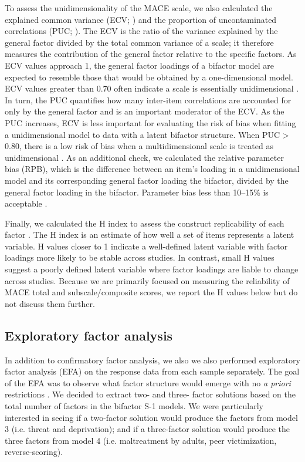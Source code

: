 \documentclass[letterpaper,man,natbib]{apa6}  %
\begin{document}
To assess the unidimensionality of the MACE scale, we also calculated the explained common variance (ECV; \citealt{sijtsma2009use}) and the proportion of uncontaminated correlations (PUC; \citealt{reise2013multidimensionality}). The ECV is the ratio of the variance explained by the general factor divided by the total common variance of a scale; it therefore measures the contribution of the general factor relative to the specific factors. As ECV values approach 1, the general factor loadings of a bifactor model are expected to resemble those that would be obtained by a one-dimensional model. ECV values greater than 0.70 often indicate a scale is essentially unidimensional \citep{rodriguez2016applying}. In turn, the PUC quantifies how many inter-item correlations are accounted for only by the general factor and is an important moderator of the ECV. As the PUC increases, ECV is less important for evaluating the risk of bias when fitting a unidimensional model to data with a latent bifactor structure. When PUC > 0.80, there is a low risk of bias when a multidimensional scale is treated as unidimensional \citep{reise2013multidimensionality}. As an additional check, we calculated the relative parameter bias (RPB), which is the difference between an item's loading in a unidimensional model and its corresponding general factor loading the bifactor, divided by the general factor loading in the bifactor. Parameter bias less than 10–15\% is acceptable \citep{muthen1987structural}.

Finally, we calculated the H index to assess the construct replicability of each factor \citep{hancock2001rethinking}. The H index is an estimate of how well a set of items represents a latent variable. H values closer to 1 indicate a well-defined latent variable with factor loadings more likely to be stable across studies. In contrast, small H values suggest a poorly defined latent variable where factor loadings are liable to change across studies. Because we are primarily focused on measuring the reliability of MACE total and subscale/composite scores, we report the H values below but do not discuss them further.

\subsection{Exploratory factor analysis}

In addition to confirmatory factor analysis, we also we also performed exploratory factor analysis (EFA) on the response data from each sample separately. The goal of the EFA was to observe what factor structure would emerge with no \emph{a priori} restrictions \citep{schmitt2018selecting}. We decided to extract two- and three- factor solutions based on the total number of factors in the bifactor S-1 models. We were particularly interested in seeing if a two-factor solution would produce the factors from model 3 (i.e. threat and deprivation); and if a three-factor solution would produce the three factors from model 4 (i.e. maltreatment by adults, peer victimization, reverse-scoring). 
\end{document}
